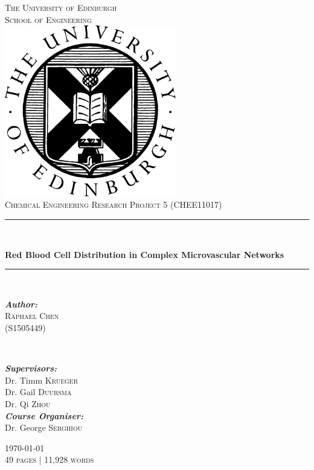\begin{titlepage}
	\begin{center}
		\newcommand{\HRule}{\rule{\linewidth}{0.8mm}} 
		
		\textsc{\LARGE The University of Edinburgh}\\
		[0.5cm] 
		\textsc{\Large School of Engineering}\\
		[2cm]
		\includegraphics[width = 75mm]{UOE_SOE_logo.png}\\
		[1.5cm]
		\textsc{\Large Chemical Engineering Research Project 5 (CHEE11017)}\\
		[1cm]
		\HRule\\
		{\Huge\bfseries\sffamily Red Blood Cell Distribution in Complex Microvascular Networks \par} 
		\HRule\\
		[1.5cm]


		
\begin{minipage}{0.4\textwidth}
	\begin{flushleft}
		\large
		\textit{\textbf{Author:}}\\
		\textsc{Raphael Chen}\\
		\textsc{(S1505449)}\\
		\end{flushleft}
\end{minipage}
	~
\begin{minipage}{0.4\textwidth}
	\begin{flushright}
		\large
		\textit{\textbf{Supervisors:}}\\
		Dr. Timm \textsc{Krueger}\\
		Dr. Gail \textsc{Duursma}\\
		Dr. Qi \textsc{Zhou} \\
		[0.5cm]
		\textit{\textbf{Course Organiser:}}\\
		Dr. George \textsc{Serghiou}
	\end{flushright}
\end{minipage}

\vfill\vfill\vfill %

\textsc{\textup{\today}} \\
[0.5cm]
\textsc{49 pages | 11,928 words}
\vfill

\end{center}
\end{titlepage}